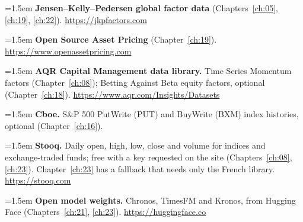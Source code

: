 \hangindent=1.5em \textbf{Jensen--Kelly--Pedersen global factor data} (Chapters~\ref{ch:05}, \ref{ch:19}, \ref{ch:22}). \url{https://jkpfactors.com}

\hangindent=1.5em \textbf{Open Source Asset Pricing} (Chapter~\ref{ch:19}). \url{https://www.openassetpricing.com}

\hangindent=1.5em \textbf{AQR Capital Management data library.} Time Series Momentum factors (Chapter~\ref{ch:08}); Betting Against Beta equity factors, optional (Chapter~\ref{ch:18}). \url{https://www.aqr.com/Insights/Datasets}

\hangindent=1.5em \textbf{Cboe.} S\&P 500 PutWrite (PUT) and BuyWrite (BXM) index histories, optional (Chapter~\ref{ch:16}).

\hangindent=1.5em \textbf{Stooq.} Daily open, high, low, close and volume for indices and exchange-traded funds; free with a key requested on the site (Chapters~\ref{ch:08}, \ref{ch:23}). Chapter~\ref{ch:23} has a fallback that needs only the French library. \url{https://stooq.com}

\hangindent=1.5em \textbf{Open model weights.} Chronos, TimesFM and Kronos, from Hugging Face (Chapters~\ref{ch:21}, \ref{ch:23}). \url{https://huggingface.co}

\endgroup
